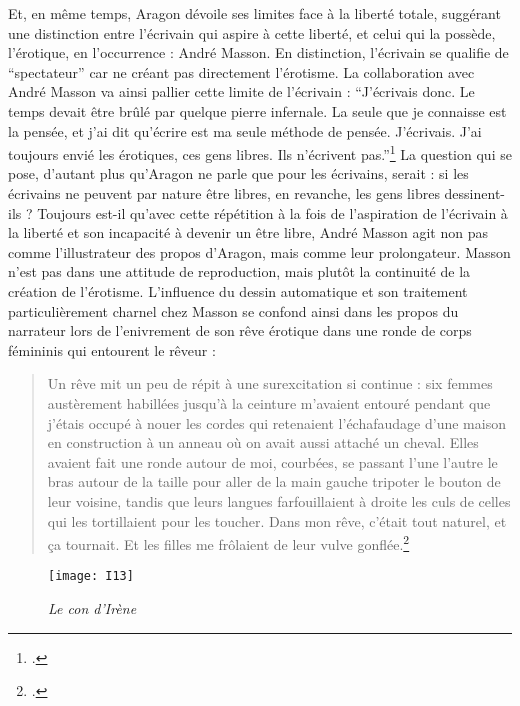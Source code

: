 	Et, en même temps, Aragon dévoile ses limites face à la liberté totale, suggérant une distinction entre l’écrivain qui aspire à cette liberté, et celui qui la possède, l’érotique, en l’occurrence : André Masson. En distinction, l’écrivain se qualifie de \enquote{spectateur} car ne créant pas directement l’érotisme. La collaboration avec André Masson va ainsi  pallier cette limite de l’écrivain : \enquote{J'écrivais donc. Le temps devait être brûlé par quelque pierre infernale. La seule que je connaisse est la pensée, et j’ai dit qu’écrire est ma seule méthode de pensée. J’écrivais. J’ai toujours envié les érotiques, ces gens libres. Ils n’écrivent pas.}\footcite[p270]{defense} La question qui se pose, d’autant plus qu’Aragon ne parle que pour les écrivains, serait : si les écrivains ne peuvent par nature être libres, en revanche, les gens libres dessinent-ils ? Toujours est-il qu’avec cette répétition à la fois de l’aspiration de l’écrivain à la liberté et son incapacité à devenir un être libre, André Masson agit non pas comme l’illustrateur des propos d’Aragon, mais comme leur prolongateur. Masson n’est pas dans une attitude de reproduction, mais plutôt la continuité de la création de l’érotisme. L'influence du dessin automatique et son traitement particulièrement charnel chez Masson se confond ainsi dans les propos du narrateur lors de l'enivrement de son rêve érotique dans une ronde de corps fémininis qui entourent le rêveur :

	\begin{quote}
	Un rêve mit un peu de répit à une surexcitation si continue : six femmes austèrement habillées jusqu’à la ceinture m’avaient entouré pendant que j’étais occupé à nouer les cordes qui retenaient l’échafaudage d’une maison en construction à un anneau où on avait aussi attaché un cheval.
	Elles avaient fait une ronde autour de moi, courbées, se passant l’une l’autre le bras autour de la taille pour aller de la main gauche tripoter le bouton de leur voisine, tandis que leurs langues farfouillaient à droite les culs de celles qui les tortillaient pour les toucher. Dans mon rêve, c’était tout naturel, et ça tournait. Et les filles me frôlaient de leur vulve gonflée.\footcite[p260]{defense}	
	\end{quote} 
	
	\begin{figure}[H]
        \centering
        \texttt{[image: I13]}   
        \caption{\emph{Le con d'Irène}}\label{fig:irene1}
	\end{figure}

